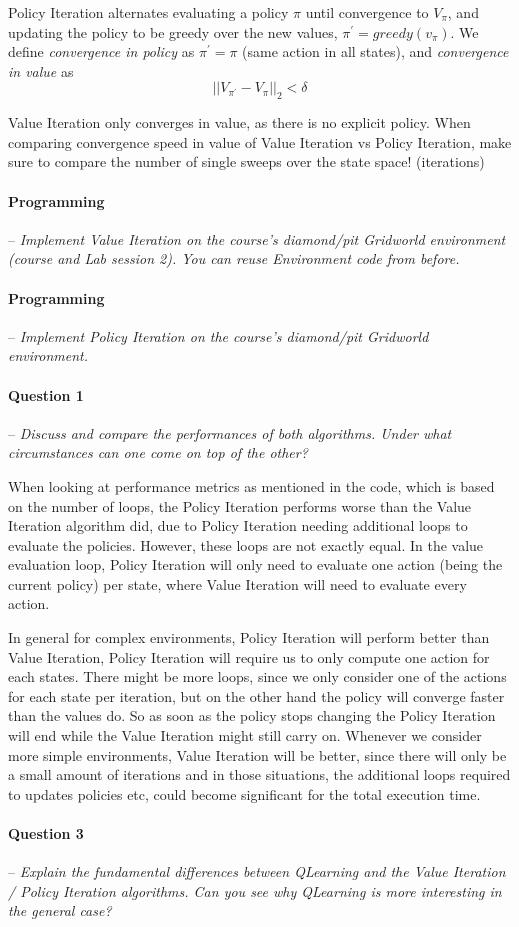 \documentclass[a4paper]{article}
\newcommand{\question}[2]{
\paragraph{Question #1} -- \textit{#2}

}
\newcommand{\programming}[1]{
\paragraph{Programming} -- \textit{#1}

}
\begin{document}
Policy Iteration alternates evaluating a policy $\pi$ until convergence to $V_\pi$, and updating the policy to be greedy over the new values, $\pi ^\prime = greedy(v_\pi)$. We define \textit{convergence in policy} as  $\pi^\prime = \pi$ (same action in all states), and \textit{convergence in value} as $$ \vert\vert V_{\pi ^\prime} - V_\pi \vert\vert_2 < \delta $$

Value Iteration only converges in value, as there is no explicit policy. When comparing convergence speed in value of Value Iteration vs Policy Iteration, make sure to compare the number of single sweeps over the state space! (iterations)

\programming{Implement Value Iteration on the course's diamond/pit Gridworld environment (course and Lab session 2). You can reuse Environment code from before.}

\programming{Implement Policy Iteration on the course's diamond/pit Gridworld environment.}

\question{1}{Discuss and compare the performances of both algorithms. Under what circumstances can one come on top of the other?}

When looking at performance metrics as mentioned in the code, which is based on the number of loops, the Policy Iteration performs worse than the Value Iteration algorithm did, due to Policy Iteration needing additional loops to evaluate the policies. However, these loops are not exactly equal. In the value evaluation loop, Policy Iteration will only need to evaluate one action (being the current policy) per state, where Value Iteration will need to evaluate every action.

In general for complex environments, Policy Iteration will perform better than Value Iteration, Policy Iteration will require us to only compute one action for each states. There might be more loops, since we only consider one of the actions for each state per iteration, but on the other hand the policy will converge faster than the values do. So as soon as the policy stops changing the Policy Iteration will end while the Value Iteration might still carry on. Whenever we consider more simple environments, Value Iteration will be better, since there will only be a small amount of iterations and in those situations, the additional loops required to updates policies etc, could become significant for the total execution time.

\question{3}{Explain the fundamental differences between QLearning and the Value Iteration / Policy Iteration algorithms. Can you see why QLearning is more interesting in the general case?}
\end{document}
